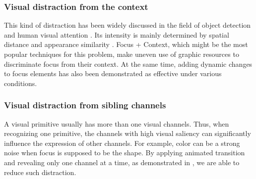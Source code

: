 \subsubsection{Visual distraction from the context}
This kind of distraction has been widely discussed in the field of object detection and human visual attention \cite{nothdurft_salience_2000, standage_modelling_2005}. Its intensity is mainly  determined by spatial distance and appearance similarity \cite{wolfe_guided_1994}.
Focus + Context, which might be the most popular techniques for this problem, make uneven use of graphic resources to discriminate focus from their context. At the same time, adding dynamic changes to focus elements has also been demonstrated as effective under various conditions\cite{waldner_attractive_2014}.  

\subsubsection{Visual distraction from sibling channels}
A visual primitive usually has more than one visual channels. Thus, when recognizing one primitive, the channels with high visual saliency can significantly influence the expression of other channels. For example, color can be a strong noise when focus is supposed to be the shape. By applying animated transition and revealing only one channel at a time, as demonstrated in , we are able to reduce such distraction.


